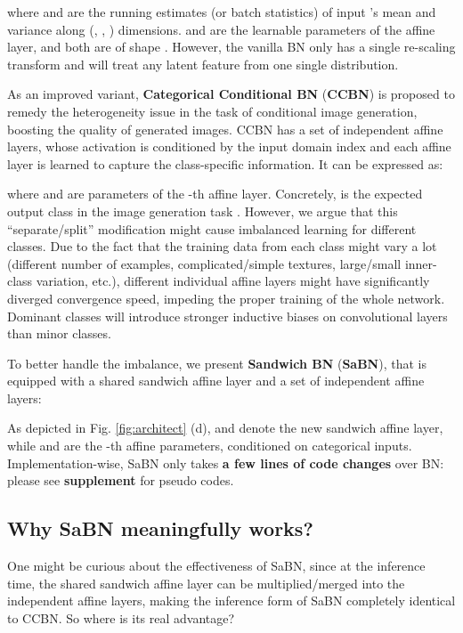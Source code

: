 \documentclass{article}
\begin{document}
where  and  are the running estimates (or batch statistics) of input 's mean and variance along (, , ) dimensions.  and  are the learnable parameters of the affine layer, and both are of shape .
However, the vanilla BN only has a single re-scaling transform and will treat any latent feature from one single distribution.

As an improved variant, \textbf{Categorical Conditional BN} (\textbf{CCBN}) \citep{miyato2018spectral} is proposed to remedy the heterogeneity issue in the task of conditional image generation, boosting the quality of generated images. CCBN has a set of independent affine layers, whose activation is conditioned by the input domain index and each affine layer is learned to capture the class-specific information. It can be expressed as: 

where  and  are parameters of the -th affine layer. Concretely,  is the expected output class in the image generation task \citep{miyato2018cgans}.  
However, we argue that this ``separate/split'' modification might cause imbalanced learning for different classes. Due to the fact that the training data from each class might vary a lot (different number of examples, complicated/simple textures, large/small inner-class variation, etc.), different individual affine layers might have significantly diverged convergence speed, impeding the proper training of the whole network. Dominant classes will introduce stronger inductive biases on convolutional layers than minor classes.

To better handle the imbalance, we present \textbf{Sandwich BN} (\textbf{SaBN}), that is equipped with a shared sandwich affine layer and a set of independent affine layers:

As depicted in Fig. \ref{fig:architect} (d),  and  denote the new sandwich affine layer, while  and  are the -th affine parameters, conditioned on categorical inputs. Implementation-wise, SaBN only takes \textbf{a few lines of code changes} over BN: please see \textbf{supplement} for pseudo codes.

\subsection{Why SaBN meaningfully works?}
One might be curious about the effectiveness of SaBN, since at the inference time, the shared sandwich affine layer can be multiplied/merged into the independent affine layers, making the inference form of SaBN completely identical to CCBN. So where is its real advantage? 
\end{document}
